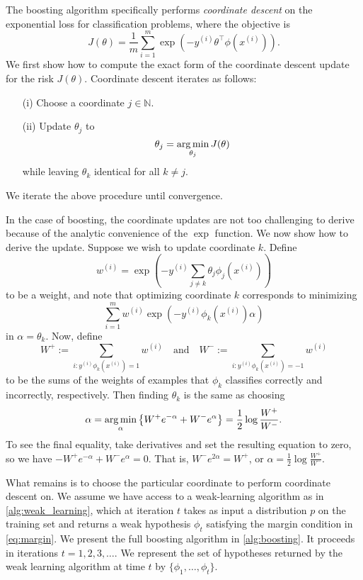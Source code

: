 The boosting algorithm specifically performs \textit{coordinate descent} on the
exponential loss for classification problems, where the objective is
\[
J(\theta) = \frac{1}{m} \sum_{i=1}^m \exp(-y^{(i)} \theta^\top \phi(x^{(i)} )).
\]
We first show how to compute the exact form of the coordinate descent
update for the risk $J(\theta)$. Coordinate descent iterates as follows:
\begin{itemize}
    \item[(i)] Choose a coordinate $j \in \mathbb N$.
    \item[(ii)] Update $\theta_j$ to
    \[
        \theta_j = \argmin_{\theta_j} J(\theta)
    \]
    while leaving $\theta_k$ identical for all $k \ne j$.
\end{itemize}
We iterate the above procedure until convergence.

In the case of boosting, the coordinate updates are not too challenging to
derive because of the analytic convenience of the $\exp$ function. We now show
how to derive the update. Suppose we wish to update coordinate $k$. Define
\[
w^{(i)} = \exp \left(-y^{(i)} \sum_{j \ne k} \theta_j \phi_j (x^{(i)} )\right)
\]
to be a weight, and note that optimizing coordinate $k$ corresponds to minimizing
\[
    \sum_{i=1}^m w^{(i)} \exp(-y^{(i)} \phi_k (x^{(i)} )\alpha)
\]
in $\alpha = \theta_k$. Now, define
\[
    W^+ := \sum_{i:y^{(i)} \phi_k (x^{(i)} )=1} w^{(i)} \quad\text{and}\quad W^- := \sum_{i:y^{(i)} \phi_k (x^{(i)} )=-1} w^{(i)}
\]
to be the sums of the weights of examples that $\phi_k$ classifies correctly and
incorrectly, respectively. Then finding $\theta_k$ is the same as choosing
\[
    \alpha = \argmin_\alpha\left\{W^+ e^{-\alpha} + W^- e^\alpha\right\} = \frac{1}{2} \log \frac{W^+}{W^-}.
\]
To see the final equality, take derivatives and set the resulting equation to
zero, so we have $-W^+ e^{-\alpha} + W^- e^\alpha = 0$. That is, $W^- e^{2\alpha} = W^+$, or $\alpha = \frac{1}{2}\log\frac{W^+}{W^-}$.

What remains is to choose the particular coordinate to perform coordinate
descent on. We assume we have access to a weak-learning algorithm as in
\cref{alg:weak_learning}, which at iteration $t$ takes as input a distribution $p$ on the training
set and returns a weak hypothesis $\phi_t$ satisfying the margin condition in \cref{eq:margin}.
We present the full boosting algorithm in \cref{alg:boosting}. It proceeds in iterations
$t = 1,2,3,\ldots$. We represent the set of hypotheses returned by the weak
learning algorithm at time $t$ by $\{\phi_1 ,\ldots,\phi_t\}$.

